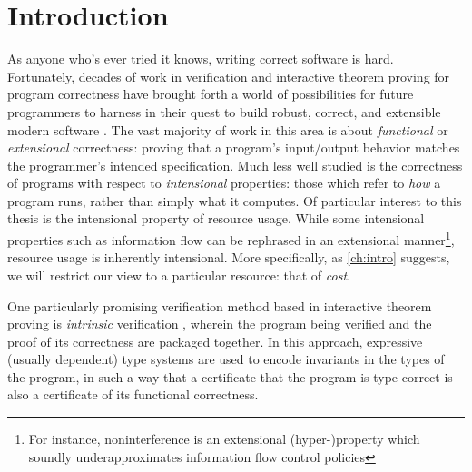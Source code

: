 \section{Introduction}
As anyone who's ever tried it knows, writing correct software is hard. Fortunately, decades of work in verification and interactive theorem proving for program correctness have brought forth a world of possibilities for future programmers to harness in their quest to build robust, correct, and extensible modern software \cite{ringer-et-al:qed}. The vast majority of work in this area is about \textit{functional} or \textit{extensional} correctness: proving that a program's input/output behavior matches the programmer's intended specification. Much less well studied is the correctness of programs with respect to \textit{intensional} properties: those which refer to \textit{how} a program runs, rather than simply what it computes. Of particular interest to this thesis is the intensional property of resource usage. While some intensional properties such as information flow can be rephrased in an extensional manner\footnote{For instance, noninterference \cite{spsm} is an extensional (hyper-)property which soundly underapproximates information flow control policies}, resource usage is inherently intensional. More specifically, as \autoref{ch:intro} suggests, we will restrict our view to a particular resource: that of \textit{cost}.

One particularly promising verification method based in interactive theorem proving is \textit{intrinsic} verification \cite{korkut-et-al:regex}, wherein the program being verified and the proof of its correctness are packaged together. In this approach, expressive (usually dependent) type systems are used to encode invariants in the types of the program, in such a way that a certificate that the program is type-correct is also a certificate of its functional correctness.

